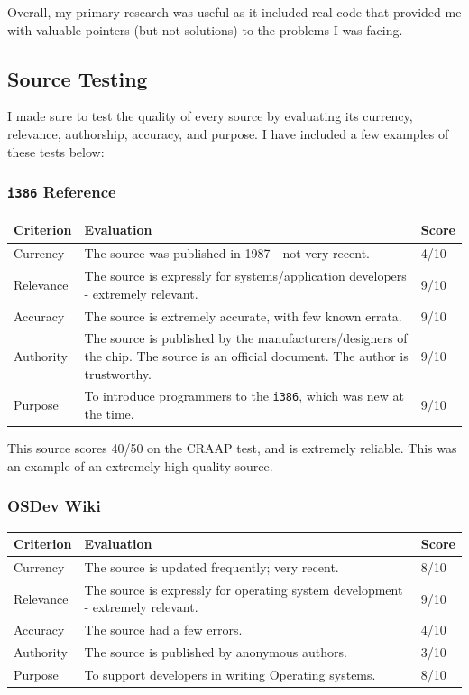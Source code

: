 \documentclass[a4paper,12pt]{article}
\begin{document}
Overall, my primary research was useful as it included real code that provided me with valuable pointers (but not solutions) to the problems I was facing. 

\subsection{Source Testing}
I made sure to test the quality of every source by evaluating its currency, relevance, authorship, accuracy, and purpose. I have included a few examples of these tests below: \\
\subsubsection{\texttt{i386} Reference}
\begin{tabularx}{\textwidth}{l|X|l}
Criterion & Evaluation & Score \\
\hline
Currency & The source was published in 1987 - not very recent. & 4/10 \\
Relevance & The source is expressly for systems/application developers - extremely relevant. & 9/10 \\
Accuracy & The source is extremely accurate, with few known errata. & 9/10 \\
Authority & The source is published by the manufacturers/designers of the chip. The source is an official document. The author is trustworthy. & 9/10 \\
Purpose & To introduce programmers to the \texttt{i386}, which was new at the time. & 9/10 \\
\end{tabularx}
\bigskip

This source scores 40/50 on the CRAAP test, and is extremely reliable. This was an example of an extremely high-quality source.\\
\subsubsection{OSDev Wiki}
\begin{tabularx}{\textwidth}{l|X|l}
Criterion & Evaluation  & Score \\
\hline
Currency & The source is updated frequently; very recent. & 8/10 \\
Relevance & The source is expressly for operating system development - extremely relevant. & 9/10 \\
Accuracy & The source had a few errors.  & 4/10 \\
Authority & The source is published by anonymous authors. & 3/10 \\
Purpose & To support developers in writing Operating systems. & 8/10 \\
\end{tabularx}
\bigskip
\end{document}
